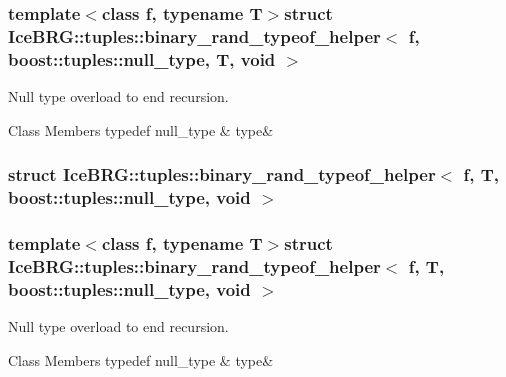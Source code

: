 \subsubsection*{template$<$class f, typename T$>$struct Ice\+B\+R\+G\+::tuples\+::binary\+\_\+rand\+\_\+typeof\+\_\+helper$<$ f, boost\+::tuples\+::null\+\_\+type, T, void $>$}

Null type overload to end recursion. \begin{DoxyFields}{Class Members}
\hypertarget{namespaceIceBRG_1_1tuples_a9fdd4714d412693da9a56de67fbb8faa}{}typedef null\+\_\+type\label{namespaceIceBRG_1_1tuples_a9fdd4714d412693da9a56de67fbb8faa}
&
type&
\\
\hline

\end{DoxyFields}
\label{structIceBRG_1_1tuples_1_1binary__rand__typeof__helper_3_01f_00_01T_00_01boost_1_1tuples_1_1null__type_00_01void_01_4}
\hypertarget{namespaceIceBRG_1_1tuples_structIceBRG_1_1tuples_1_1binary__rand__typeof__helper_3_01f_00_01T_00_01boost_1_1tuples_1_1null__type_00_01void_01_4}{}
\subsubsection{struct Ice\+B\+R\+G\+:\+:tuples\+:\+:binary\+\_\+rand\+\_\+typeof\+\_\+helper$<$ f, T, boost\+:\+:tuples\+:\+:null\+\_\+type, void $>$}
\subsubsection*{template$<$class f, typename T$>$struct Ice\+B\+R\+G\+::tuples\+::binary\+\_\+rand\+\_\+typeof\+\_\+helper$<$ f, T, boost\+::tuples\+::null\+\_\+type, void $>$}

Null type overload to end recursion. \begin{DoxyFields}{Class Members}
\hypertarget{namespaceIceBRG_1_1tuples_a3f8d9d33739ad79e775208cdf6ebc2eb}{}typedef null\+\_\+type\label{namespaceIceBRG_1_1tuples_a3f8d9d33739ad79e775208cdf6ebc2eb}
&
type&
\\
\hline

\end{DoxyFields}
\label{structIceBRG_1_1tuples_1_1divide__typeof__helper}
\hypertarget{namespaceIceBRG_1_1tuples_structIceBRG_1_1tuples_1_1divide__typeof__helper}{}
